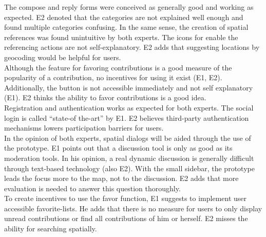 The compose and reply forms were conceived as generally good and working as expected. E2 denoted that the categories are not explained well enough and found multiple categories confusing. In the same sense, the creation of spatial references was found unintuitive by both experts. The icons for enable the referencing actions are not self-explanatory. E2 adds that suggesting locations by geocoding would be helpful for users.\\
Although the feature for favoring contributions is a good measure of the popularity of a contribution, no incentives for using it exist (E1, E2). Additionally, the button is not accessible immediately and not self explanatory (E1). E2 thinks the ability to favor contributions is a good idea.\\
Registration and authentication works as expected for both experts. The social login is called ``state-of the-art'' by E1. E2 believes third-party authentication mechanisms lowers participation barriers for users.\\
In the opinion of both experts, spatial dialogs will be aided through the use of the prototype. E1 points out that a discussion tool is only as good as its moderation tools. In his opinion, a real dynamic discussion is generally difficult through text-based technology (also E2). With the small sidebar, the prototype leads the focus more to the map, not to the discussion. E2 adds that more evaluation is needed to answer this question thoroughly.\\
To create incentives to use the favor function, E1 suggests to implement user accessible favorite-lists. He adds that there is no measure for users to only display unread contributions or find all contributions of him or herself. E2 misses the ability for searching spatially.\\


